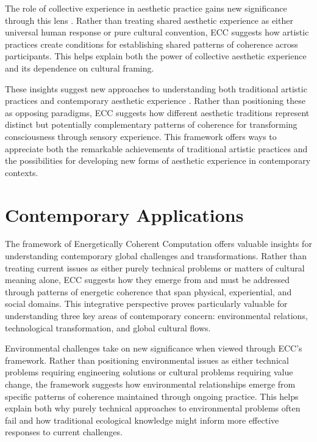 \begin{refsection}
The role of collective experience in aesthetic practice gains new significance through this lens \cite{schieffelin1976sorrow}. Rather than treating shared aesthetic experience as either universal human response or pure cultural convention, ECC suggests how artistic practices create conditions for establishing shared patterns of coherence across participants. This helps explain both the power of collective aesthetic experience and its dependence on cultural framing.

These insights suggest new approaches to understanding both traditional artistic practices and contemporary aesthetic experience \cite{coote1992anthropology}. Rather than positioning these as opposing paradigms, ECC suggests how different aesthetic traditions represent distinct but potentially complementary patterns of coherence for transforming consciousness through sensory experience. This framework offers ways to appreciate both the remarkable achievements of traditional artistic practices and the possibilities for developing new forms of aesthetic experience in contemporary contexts.

\section{Contemporary Applications}

The framework of Energetically Coherent Computation offers valuable insights for understanding contemporary global challenges and transformations. Rather than treating current issues as either purely technical problems or matters of cultural meaning alone, ECC suggests how they emerge from and must be addressed through patterns of energetic coherence that span physical, experiential, and social domains. This integrative perspective proves particularly valuable for understanding three key areas of contemporary concern: environmental relations, technological transformation, and global cultural flows.

Environmental challenges take on new significance when viewed through ECC's framework. Rather than positioning environmental issues as either technical problems requiring engineering solutions or cultural problems requiring value change, the framework suggests how environmental relationships emerge from specific patterns of coherence maintained through ongoing practice. This helps explain both why purely technical approaches to environmental problems often fail and how traditional ecological knowledge might inform more effective responses to current challenges.


\end{refsection}
